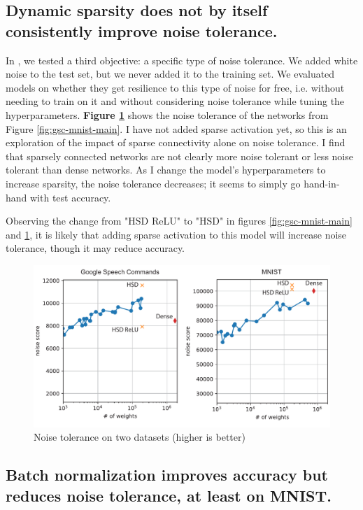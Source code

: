 \documentclass[11pt]{article}
\begin{document}
\subsection{Dynamic sparsity does not by itself consistently improve noise tolerance.}
\label{sec:org708be52}

In \citep{ahmad2019dense}, we tested a third objective: a specific type of noise tolerance. We added white noise to the test set, but we never added it to the training set. We evaluated models on whether they get resilience to this type of noise for free, i.e. without needing to train on it and without considering noise tolerance while tuning the hyperparameters. \textbf{Figure \ref{fig:gsc-mnist-noise}} shows the noise tolerance of the networks from Figure \ref{fig:gsc-mnist-main}. I have not added sparse activation yet, so this is an exploration of the impact of sparse connectivity alone on noise tolerance. I find that sparsely connected networks are not clearly more noise tolerant or less noise tolerant than dense networks. As I change the model's hyperparameters to increase sparsity, the noise tolerance decreases; it seems to simply go hand-in-hand with test accuracy.

Observing the change from "HSD ReLU" to "HSD" in figures \ref{fig:gsc-mnist-main} and \ref{fig:gsc-mnist-noise}, it is likely that adding sparse activation to this model will increase noise tolerance, though it may reduce accuracy.

\begin{figure}[htbp]
\centering
\includegraphics[width=5in]{./figures/gsc-mnist-noise.pdf}
\caption{Noise tolerance on two datasets (higher is better) \label{fig:gsc-mnist-noise}}
\end{figure}


\subsection{Batch normalization improves accuracy but reduces noise tolerance, at least on MNIST.}
\label{sec:org299a864}
\end{document}
